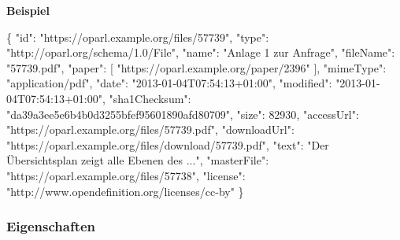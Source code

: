\documentclass[,a4paper]{article}
\newenvironment{Shaded}{}{}
\newcommand{\DataTypeTok}[1]{\textcolor[rgb]{0.56,0.13,0.00}{{#1}}}
\newcommand{\DecValTok}[1]{\textcolor[rgb]{0.25,0.63,0.44}{{#1}}}
\newcommand{\StringTok}[1]{\textcolor[rgb]{0.25,0.44,0.63}{{#1}}}
\newcommand{\OtherTok}[1]{\textcolor[rgb]{0.00,0.44,0.13}{{#1}}}
\newcommand{\FunctionTok}[1]{\textcolor[rgb]{0.02,0.16,0.49}{{#1}}}
\begin{document}
\textbf{Beispiel}

\begin{Shaded}
\begin{Highlighting}[]
\FunctionTok{\{}
    \DataTypeTok{"id"}\FunctionTok{:} \StringTok{"https://oparl.example.org/files/57739"}\FunctionTok{,}
    \DataTypeTok{"type"}\FunctionTok{:} \StringTok{"http://oparl.org/schema/1.0/File"}\FunctionTok{,}
    \DataTypeTok{"name"}\FunctionTok{:} \StringTok{"Anlage 1 zur Anfrage"}\FunctionTok{,}
    \DataTypeTok{"fileName"}\FunctionTok{:} \StringTok{"57739.pdf"}\FunctionTok{,}
    \DataTypeTok{"paper"}\FunctionTok{:} \OtherTok{[}
        \StringTok{"https://oparl.example.org/paper/2396"}
    \OtherTok{]}\FunctionTok{,}
    \DataTypeTok{"mimeType"}\FunctionTok{:} \StringTok{"application/pdf"}\FunctionTok{,}
    \DataTypeTok{"date"}\FunctionTok{:} \StringTok{"2013-01-04T07:54:13+01:00"}\FunctionTok{,}
    \DataTypeTok{"modified"}\FunctionTok{:} \StringTok{"2013-01-04T07:54:13+01:00"}\FunctionTok{,}
    \DataTypeTok{"sha1Checksum"}\FunctionTok{:} \StringTok{"da39a3ee5e6b4b0d3255bfef95601890afd80709"}\FunctionTok{,}
    \DataTypeTok{"size"}\FunctionTok{:} \DecValTok{82930}\FunctionTok{,}
    \DataTypeTok{"accessUrl"}\FunctionTok{:} \StringTok{"https://oparl.example.org/files/57739.pdf"}\FunctionTok{,}
    \DataTypeTok{"downloadUrl"}\FunctionTok{:} \StringTok{"https://oparl.example.org/files/download/57739.pdf"}\FunctionTok{,}
    \DataTypeTok{"text"}\FunctionTok{:} \StringTok{"Der Übersichtsplan zeigt alle Ebenen des ..."}\FunctionTok{,}
    \DataTypeTok{"masterFile"}\FunctionTok{:} \StringTok{"https://oparl.example.org/files/57738"}\FunctionTok{,}
    \DataTypeTok{"license"}\FunctionTok{:} \StringTok{"http://www.opendefinition.org/licenses/cc-by"}
\FunctionTok{\}}
\end{Highlighting}
\end{Shaded}

\subsubsection{Eigenschaften}\label{eigenschaften-7}
\end{document}
